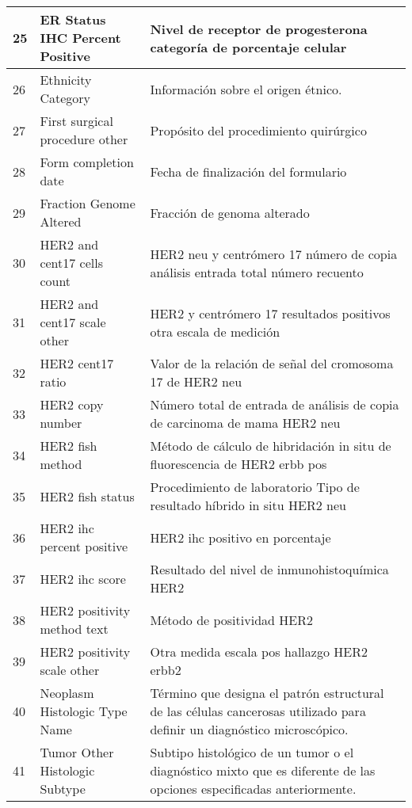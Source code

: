 \begin{table*} [!htb]
	\footnotesize
	\begin{threeparttable}
		\begin{tabular}{p{1cm} p{4cm} p{10cm}}         
			\\ \hline	25	&	ER Status IHC Percent Positive	&	Nivel de receptor de progesterona categoría de porcentaje celular
			\\ \hline	26	&	Ethnicity Category	&	Información sobre el origen étnico.
			\\ \hline	27	&	First surgical procedure other	&	Propósito del procedimiento quirúrgico
			\\ \hline	28	&	Form completion date	&	Fecha de finalización del formulario
			\\ \hline	29	&	Fraction Genome Altered	&	Fracción de genoma alterado
			\\ \hline	30	&	HER2 and cent17 cells count	&	HER2 neu y centrómero 17 número de copia análisis entrada total número recuento
			\\ \hline	31	&	HER2 and cent17 scale other	&	HER2 y centrómero 17 resultados positivos otra escala de medición
			\\ \hline	32	&	HER2 cent17 ratio	&	Valor de la relación de señal del cromosoma 17 de HER2 neu
			\\ \hline	33	&	HER2 copy number	&	Número total de entrada de análisis de copia de carcinoma de mama HER2 neu
			\\ \hline	34	&	HER2 fish method	&	Método de cálculo de hibridación in situ de fluorescencia de HER2 erbb pos
			\\ \hline	35	&	HER2 fish status	&	Procedimiento de laboratorio Tipo de resultado híbrido in situ HER2 neu
			\\ \hline	36	&	HER2 ihc percent positive	&	HER2 ihc positivo en porcentaje
			\\ \hline	37	&	HER2 ihc score	&	Resultado del nivel de inmunohistoquímica HER2
			\\ \hline	38	&	HER2 positivity method text	&	Método de positividad HER2
			\\ \hline	39	&	HER2 positivity scale other	&	Otra medida escala pos hallazgo HER2 erbb2 
			\\ \hline	40	&	Neoplasm Histologic Type Name	&	Término que designa el patrón estructural de las células cancerosas utilizado para definir un diagnóstico microscópico.
			\\ \hline	41	&	Tumor Other Histologic Subtype	&	Subtipo histológico de un tumor o el diagnóstico mixto que es diferente de las opciones especificadas anteriormente.

\end{tabular}
\end{threeparttable}
\end{table*}
